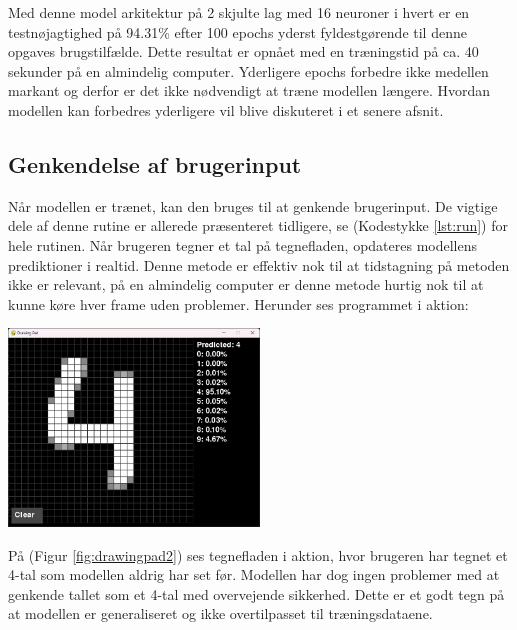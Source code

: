 \documentclass{article}
\newcommand{\figureref}[1]{(Figur \ref{#1})}
\newcommand{\listingref}[1]{(Kodestykke \ref{#1})}
\begin{document}
Med denne model arkitektur på 2 skjulte lag med 16 neuroner i hvert er en testnøjagtighed på 94.31\% efter 100 epochs yderst fyldestgørende til denne opgaves brugstilfælde. Dette resultat er opnået med en træningstid på ca. 40 sekunder på en almindelig computer. Yderligere epochs forbedre ikke medellen markant og derfor er det ikke nødvendigt at træne modellen længere. Hvordan modellen kan forbedres yderligere vil blive diskuteret i et senere afsnit.
\subsection{Genkendelse af brugerinput}
Når modellen er trænet, kan den bruges til at genkende brugerinput. De vigtige dele af denne rutine er allerede præsenteret tidligere, se \listingref{lst:run} for hele rutinen. Når brugeren tegner et tal på tegnefladen, opdateres modellens prediktioner i realtid. Denne metode er effektiv nok til at tidstagning på metoden ikke er relevant, på en almindelig computer er denne metode hurtig nok til at kunne køre hver frame uden problemer. Herunder ses programmet i aktion:
\begin{center}
  \includegraphics[width=0.5\textwidth]{drawingpad2.png}
  \label{fig:drawingpad2}
\end{center}
På \figureref{fig:drawingpad2} ses tegnefladen i aktion, hvor brugeren har tegnet et 4-tal som modellen aldrig har set før. Modellen har dog ingen problemer med at genkende tallet som et 4-tal med overvejende sikkerhed. Dette er et godt tegn på at modellen er generaliseret og ikke overtilpasset til træningsdataene.
\end{document}
